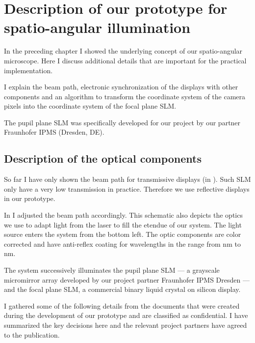 
\chapter{Description of our prototype for spatio-angular illumination}
\label{sec:dev1}
\begin{summary}
  In the preceding chapter I showed the underlying concept of our
  spatio-angular microscope. Here I discuss additional details that
  are important for the practical implementation.

  I explain the beam path, electronic synchronization of the displays
  with other components and an algorithm to transform the coordinate
  system of the camera pixels into the coordinate system of the focal
  plane SLM.
  
  The pupil plane SLM was specifically developed for our project by    
  our partner Fraunhofer IPMS (Dresden, DE). 
\end{summary}
\section{Description of the optical components}
So far I have only shown the beam path for transmissive displays (in
). Such SLM only have a very low transmission
in practice. Therefore we use reflective displays in our prototype.

In  I adjusted the beam path accordingly. This
schematic also depicts the optics we use to adapt light from the laser
to fill the etendue of our system. The light source enters the system
from the bottom left. The optic components are color corrected and
have anti-reflex coating for wavelengths in the range from
\unit[400]{nm} to \unit[700]{nm}.

The system successively illuminates the pupil plane SLM --- a grayscale
micromirror array developed by our project partner Fraunhofer IPMS
Dresden --- and the focal plane SLM, a commercial binary liquid crystal
on silicon display.
 
I gathered some of the following details from the documents that were
created during the development of our prototype and are classified as
confidential. I have summarized the key decisions here and the
relevant project partners have agreed to the publication.


